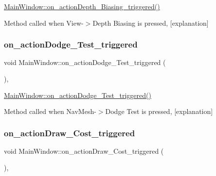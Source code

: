 \hyperlink{class_main_window_a85f9b158b4cf913593135ac5b3321b81}{Main\+Window\+::on\+\_\+action\+Depth\+\_\+\+Biasing\+\_\+triggered()} 

Method called when View-\/$>$Depth Biasing is pressed, \mbox{[}explanation\mbox{]} \mbox{\label{class_main_window_a7f4c3556edcac3d936562bf4d56f25ba}} 
\subsubsection{\texorpdfstring{on\+\_\+action\+Dodge\+\_\+\+Test\+\_\+triggered}{on\_actionDodge\_Test\_triggered}}
{\footnotesize\ttfamily void Main\+Window\+::on\+\_\+action\+Dodge\+\_\+\+Test\+\_\+triggered (\begin{DoxyParamCaption}{ }\end{DoxyParamCaption})\hspace{0.3cm}{\ttfamily [private]}, {\ttfamily [slot]}}



\hyperlink{class_main_window_a7f4c3556edcac3d936562bf4d56f25ba}{Main\+Window\+::on\+\_\+action\+Dodge\+\_\+\+Test\+\_\+triggered()} 

Method called when Nav\+Mesh-\/$>$Dodge Test is pressed, \mbox{[}explanation\mbox{]} \mbox{\label{class_main_window_a01e3738d5bea469303149a2764d3acc6}} 
\subsubsection{\texorpdfstring{on\+\_\+action\+Draw\+\_\+\+Cost\+\_\+triggered}{on\_actionDraw\_Cost\_triggered}}
{\footnotesize\ttfamily void Main\+Window\+::on\+\_\+action\+Draw\+\_\+\+Cost\+\_\+triggered (\begin{DoxyParamCaption}{ }\end{DoxyParamCaption})\hspace{0.3cm}{\ttfamily [private]}, {\ttfamily [slot]}}



